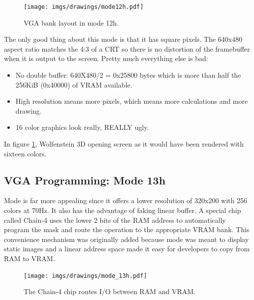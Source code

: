 \documentclass[book.tex]{subfiles}
\begin{document}
\begin{figure}[H]
\centering
 \texttt{[image: imgs/drawings/mode12h.pdf]}
\caption{VGA bank layout in mode 12h.}
\end{figure}
\pagebreak

The only good thing about this mode is that it has square pixels. The 640x480 aspect ratio matches the 4:3 of a CRT so there is no distortion of the framebuffer when it is output to the screen. Pretty much everything else is bad:\\
\begin{itemize}
\item No double buffer: 640X480/2 = 0x25800 bytes which is more than half the 256KiB (0x40000) of VRAM available.
\item High resolution means more pixels, which means more calculations and more drawing.
\item 16 color graphics look really, REALLY ugly.
\end{itemize}

 \begin{figure}[H]
\centering
 \caption{}
 \label{wolf16}
\end{figure}
\par
In figure \ref{wolf16}, Wolfenstein 3D opening screen as it would have been rendered with sixteen colors.




 \pagebreak
  \subsection{VGA Programming: Mode 13h}
  Mode  is far more appealing since it offers a lower resolution of 320x200 with 256 colors at 70Hz. It also has the advantage of faking linear buffer. A special chip called Chain-4 uses the lower 2 bits of the RAM address to automatically program the mask and route the operation to the appropriate VRAM bank. This convenience mechanism was originally added because mode  was meant to display static images and a linear address space made it easy for developers to copy from RAM to VRAM.\\
  \par
 \begin{figure}[H]
\centering
      \texttt{[image: imgs/drawings/mode\_13h.pdf]}
      \caption{The Chain-4 chip routes I/O between RAM and VRAM.}
\end{figure}
\par
\end{document}
